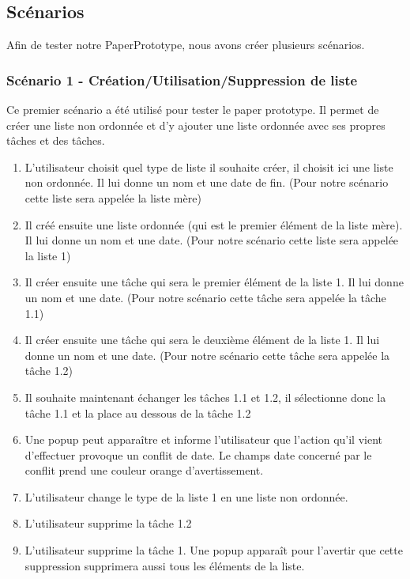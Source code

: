 \documentclass[a4paper,10pt]{article}
\begin{document}
\subsection{Scénarios}
Afin de tester notre PaperPrototype, nous avons créer plusieurs scénarios.
\subsubsection{Scénario 1 - Création/Utilisation/Suppression de liste}
Ce premier scénario a été utilisé pour tester le paper prototype. Il permet de créer une liste non ordonnée et d'y ajouter une liste ordonnée avec ses propres tâches et des tâches.
\begin{enumerate}
\item{L'utilisateur choisit quel type de liste il souhaite créer, il choisit ici une liste non ordonnée. Il lui donne un nom et une date de fin. (Pour notre scénario cette liste sera appelée la liste mère)}
\item{Il créé ensuite une liste ordonnée (qui est le premier élément de la liste mère). Il lui donne un nom et une date. (Pour notre scénario cette liste sera appelée la liste 1)}
\item{Il créer ensuite une tâche qui sera le premier élément de la liste 1. Il lui donne un nom et une date. (Pour notre scénario cette tâche sera appelée la tâche 1.1)}
\item{Il créer ensuite une tâche qui sera le deuxième élément de la liste 1. Il lui donne un nom et une date. (Pour notre scénario cette tâche sera appelée la tâche 1.2)}
\item{Il souhaite maintenant échanger les tâches 1.1 et 1.2, il sélectionne donc la tâche 1.1 et la place au dessous de la tâche 1.2}
\item{Une popup peut apparaître et informe l'utilisateur que l'action qu'il vient d'effectuer provoque un conflit de date. Le champs date concerné par le conflit prend une couleur orange d'avertissement.}
\item{L'utilisateur change le type de la liste 1 en une liste non ordonnée.}
\item{L'utilisateur supprime la tâche 1.2}
\item{L'utilisateur supprime la tâche 1. Une popup apparaît pour l'avertir que cette suppression supprimera aussi tous les éléments de la liste.}
\end{enumerate}
\end{document}
